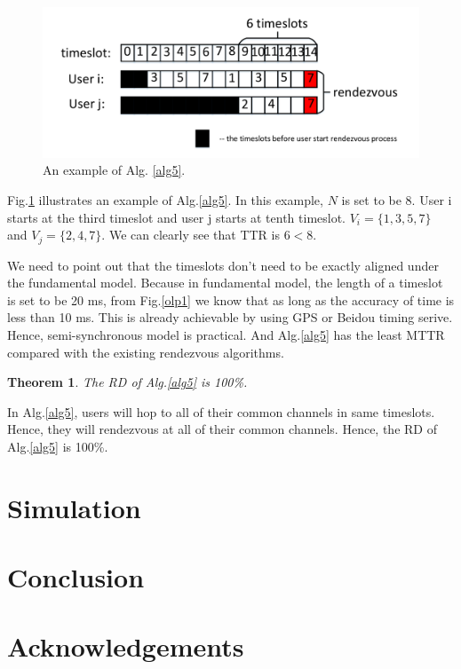 \documentclass[10pt, conference, letterpaper]{IEEEtran}
\newtheorem{theorem}{Theorem}
\begin{document}
\begin{figure}[!t]
\centering
\includegraphics[width=1\columnwidth]{semi}
\caption{An example of Alg. {\ref{alg5}}.}
\label{exp_alg4}
\end{figure}

Fig.\ref{exp_alg4} illustrates an example of Alg.\ref{alg5}. In this example, $N$ is set to be 8. User i starts at the third timeslot and user j starts at tenth timeslot. $V_i = \{1,3,5,7\}$ and $V_j=\{2,4,7\}$. We can clearly see that TTR is $6 < 8$.

We need to point out that the timeslots don't need to be exactly aligned under the fundamental model. Because in fundamental model, the length of a timeslot is set to be 20 ms, from Fig.\ref{olp1} we know that as long as the accuracy of time is less than 10 ms. This is already achievable by using GPS or Beidou timing serive. Hence, semi-synchronous model is practical. And Alg.\ref{alg5} has the least MTTR compared with the existing rendezvous algorithms.

\begin{theorem}
The RD of Alg.\ref{alg5} is 100\%.
\end{theorem}

\begin{IEEEproof}
In Alg.\ref{alg5}, users will hop to all of their common channels in same timeslots. Hence, they will rendezvous at all of their common channels. Hence, the RD of Alg.\ref{alg5} is 100\%.
\end{IEEEproof}


\section{Simulation}

\section{Conclusion}

\section{Acknowledgements}



%
%
\end{document}
